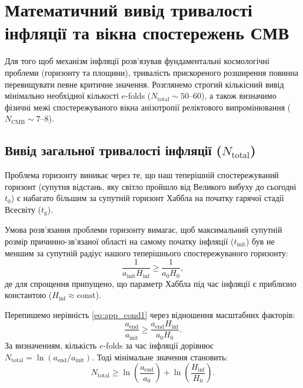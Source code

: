 
\chapter{Математичний вивід тривалості інфляції та вікна спостережень СМВ}
\label{sec:appendix_efolds}

Для того щоб механізм інфляції розв'язував фундаментальні космологічні проблеми (горизонту та площини), тривалість прискореного розширення повинна перевищувати певне критичне значення. Розглянемо строгий кількісний вивід мінімально необхідної кількості $e$-folds ($N_{\mathrm{total}} \sim 50$--$60$), а також визначимо фізичні межі спостережуваного вікна анізотропії реліктового випромінювання ($N_{\mathrm{CMB}} \sim 7$--$8$).

\section{Вивід загальної тривалості інфляції ($N_{\mathrm{total}}$)}

Проблема горизонту виникає через те, що наш теперішній спостережуваний горизонт (супутня відстань, яку світло пройшло від Великого вибуху до сьогодні $t_0$) є набагато більшим за супутній горизонт Хаббла на початку гарячої стадії Всесвіту ($t_{\mathrm{g}}$).

Умова розв'язання проблеми горизонту вимагає, щоб максимальний супутній розмір причинно-зв'язаної області на самому початку інфляції ($t_{\mathrm{init}}$) був не меншим за супутній радіус нашого теперішнього спостережуваного горизонту:
\begin{equation}
\label{eq:app_cond1}
\frac{1}{a_{\mathrm{init}} H_{\mathrm{inf}}} \ge \frac{1}{a_0 H_0},
\end{equation}
де для спрощення припущено, що параметр Хаббла під час інфляції є приблизно константою ($H_{\mathrm{inf}} \approx \text{const}$).

Перепишемо нерівність \eqref{eq:app_cond1} через відношення масштабних факторів:
\begin{equation}
\label{eq:app_ratio}
\frac{a_{\mathrm{end}}}{a_{\mathrm{init}}} \ge \frac{a_{\mathrm{end}} H_{\mathrm{inf}}}{a_0 H_0}.
\end{equation}
За визначенням, кількість $e$-folds за час інфляції дорівнює $N_{\mathrm{total}} = \ln(a_{\mathrm{end}}/a_{\mathrm{init}})$. Тоді мінімальне значення становить:
\begin{equation}
\label{eq:app_nmin}
  N_{\mathrm{total}} \ge \ln \left( \frac{a_{\mathrm{end}}}{a_0} \right) + \ln \left( \frac{H_{\mathrm{inf}}}{H_0} \right).
\end{equation}

